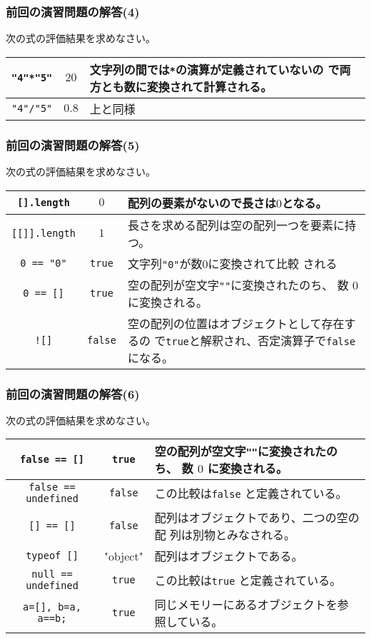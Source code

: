 \begin{frame}[containsverbatim]
\frametitle{前回の演習問題の解答(4)}
次の式の評価結果を求めなさい。
\begin{center}
 \begin{tabular}{|>{\Rule}c|c|m{}|}\hline
  \Verb+"4"*"5"+& $20$& 文字列の間では\Verb+*+の演算が定義されていないの
    で両方とも数に変換されて計算される。\\ \hline
  \Verb+"4"/"5"+& $0.8$& 上と同様\\ \hline
 \end{tabular}
\end{center}
\end{frame}
\begin{frame}[containsverbatim]
\frametitle{前回の演習問題の解答(5)}
次の式の評価結果を求めなさい。
\begin{center}
 \begin{tabular}{|>{\Rule}c|c|m{}|}\hline
  \Verb+[].length+& $0$& 配列の要素がないので長さは$0$となる。\\ \hline
  \Verb+[[]].length+&$1$ & 長さを求める配列は空の配列一つを要素に持つ。\\ \hline
  \Verb+0 == "0"+& \Verb+true+& 文字列\Verb+"0"+が数$0$に変換されて比較
    される\\ \hline
  \Verb+0 == []+& \Verb+true+& 空の配列が空文字\texttt{""}に変換されたのち、
    数 $0$ に変換される。\\ \hline
  \Verb+![]+& \Verb+false+& 空の配列の位置はオブジェクトとして存在するの
          で\texttt{true}と解釈され、否定演算子で\texttt{false}になる。
          \\ \hline
 \end{tabular}
\end{center}
\end{frame}
\begin{frame}[containsverbatim]
\frametitle{前回の演習問題の解答(6)}
次の式の評価結果を求めなさい。
\begin{center}
 \begin{tabular}{|>{\Rule}c|c|m{}|}\hline
  \Verb+false == []+& \Verb+true+& 空の配列が空文字\texttt{""}に変換されたのち、
    数 $0$ に変換される。\\ \hline
  \Verb+false == undefined+& \texttt{false}&この比較は\texttt{false}
  と定義されている。\\ \hline
  \Verb+[] == []+& \Verb+false+& 配列はオブジェクトであり、二つの空の配
    列は別物とみなされる。\\ \hline
  \Verb+typeof []+& "object"& 配列はオブジェクトである。\\ \hline
  \Verb+null == undefined+& \Verb+true+ & この比較は\texttt{true}
  と定義されている。\\ \hline
  \Verb+a=[], b=a, a==b;+&\Verb+true+&同じメモリーにあるオブジェクトを参
    照している。\\ \hline
 \end{tabular}
\end{center}
\end{frame}
